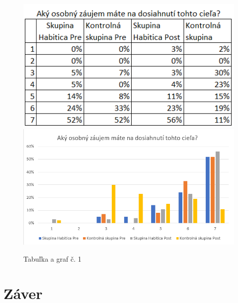 \documentclass[10pt,twoside,slovak,a4paper]{article}
\begin{document}
\begin{figure}[h]
\caption{Tabuľka a graf č. 1}
\includegraphics[scale=1]{zaujemTable.png}
\includegraphics[scale=0.6]{zaujem.png}
\centering
\end{figure}

\section{Záver} \label{conclusion}


\end{document}
